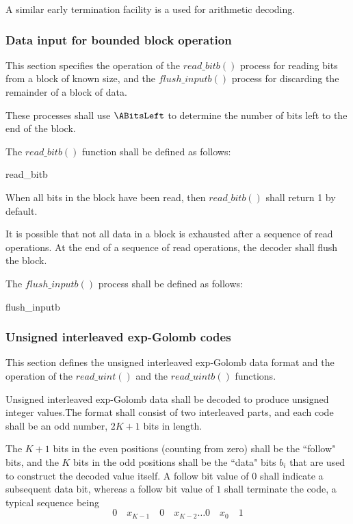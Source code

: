 \begin{informative}
A similar early termination facility is a used for arithmetic decoding.
\end{informative}

\subsubsection{Data input for bounded block operation}
\label{blockreadbit}

This section specifies the operation of the $read\_bitb()$ process for reading bits from
a block of known size, and the $flush\_inputb()$ process for discarding the remainder of a block of 
data. 

These processes shall use $\ABitsLeft$ to determine the number of bits left to the 
end of the block.

The $read\_bitb()$ function shall be defined as follows:

\begin{pseudo}{read\_bitb}{}
\bsELSE
\bsEND
\end{pseudo}

When all bits in the block have been read, then $read\_bitb()$ shall return 1 by default. 

It is possible that not all data in a block is exhausted after a sequence of read operations.
At the end of a sequence of read operations, the decoder shall flush the block. 

The $flush\_inputb()$ process shall be defined as follows:

\begin{pseudo}{flush\_inputb}{}
\bsEND
\end{pseudo}

\subsubsection{Unsigned interleaved exp-Golomb codes}
This section defines the unsigned interleaved exp-Golomb data format and the operation
of the $read\_uint()$ and the $read\_uintb()$ functions. 

Unsigned interleaved exp-Golomb data shall be decoded to produce unsigned
 integer values.The format shall consist of two interleaved parts, 
and each code shall be an odd number, $2K+1$ bits in length.

The $K+1$ bits in the even positions (counting from zero) shall be the ``follow" bits, and 
the $K$ bits in the odd positions shall be the ``data" bits $b_i$ that are used to construct
the decoded value itself. A follow bit value of $0$ shall indicate a subsequent data bit,
whereas a follow bit value of $1$ shall terminate the code, a typical sequence being
\begin{equation*}
0\quad x_{K-1}\quad 0\quad x_{K-2}\hdots 0\quad x_{0}\quad 1
\end{equation*}

